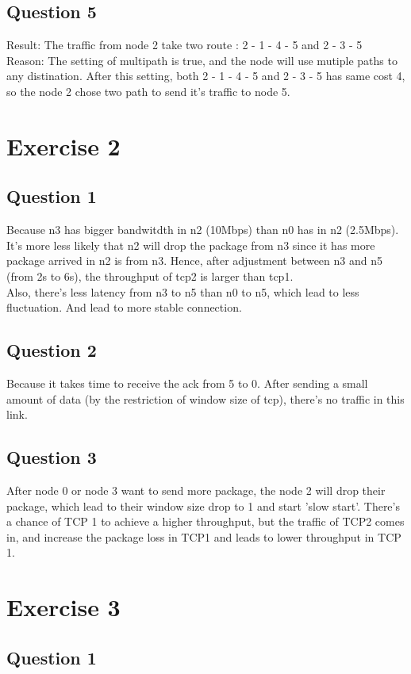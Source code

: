 \documentclass{article}
\begin{document}
\subsection{Question 5}

Result: The traffic from node 2 take two route : 2 - 1 - 4 - 5 and 2 - 3 - 5 \\
Reason: The setting of multipath is true, and the node will use mutiple paths to any distination. After this setting, both 2 - 1 - 4 - 5 and 2 - 3 - 5 has same cost 4, so the node 2 chose two path to send it's traffic to node 5.

\section{Exercise 2}

\subsection{Question 1}

Because n3 has bigger bandwitdth in n2 (10Mbps) than n0 has in n2 (2.5Mbps). It's more less likely that n2 will drop the package from n3 since it has more package arrived in n2 is from n3. Hence, after adjustment between n3 and n5 (from 2s to 6s), the throughput of tcp2 is larger than tcp1. \\
Also, there's less latency from n3 to n5 than n0 to n5, which lead to less fluctuation. And lead to more stable connection. 

\subsection{Question 2}

Because it takes time to receive the ack from 5 to 0. After sending a small amount of data (by the restriction of window size of tcp), there's no traffic in this link. 

\subsection{Question 3}

After node 0 or node 3 want to send more package, the node 2 will drop their package, which lead to their window size drop to 1 and start 'slow start'. There's a chance of TCP 1 to achieve a higher throughput, but the traffic of TCP2 comes in, and increase the package loss in TCP1 and leads to lower throughput in TCP 1. 

\section{Exercise 3}

\subsection{Question 1}
\end{document}
